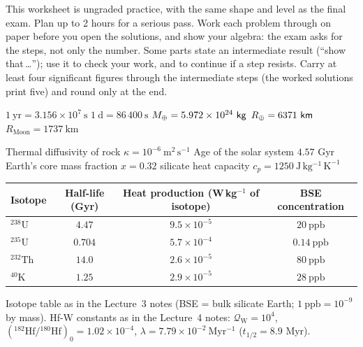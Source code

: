 
\ipsmaketitle

This worksheet is ungraded practice, with the same shape and level as the final exam.
Plan up to 2 hours for a serious pass.
Work each problem through on paper before you open the solutions, and show your algebra:
the exam asks for the steps, not only the number.
Some parts state an intermediate result (``show that\,\ldots''); use it to check your work, and to continue if a step resists.
Carry at least four significant figures through the intermediate steps (the worked solutions print five) and round only at the end.

\begin{given}
$1\ \mathrm{yr} = 3.156 \times 10^{7}\ \mathrm{s}$ \quad
$1\ \mathrm{d} = 86\,400\ \mathrm{s}$ \quad
$\Mearth = 5.972 \times 10^{24}\ \mathrm{kg}$ \quad
$\Rearth = 6371\ \mathrm{km}$ \quad
$R_{\mathrm{Moon}} = 1737\ \mathrm{km}$

\vskip4pt
Thermal diffusivity of rock $\kappa = 10^{-6}\ \mathrm{m^2\,s^{-1}}$ \quad
Age of the solar system $4.57$ Gyr \quad
Earth's core mass fraction $x = 0.32$ \quad
silicate heat capacity $c_p = 1250\ \mathrm{J\,kg^{-1}\,K^{-1}}$

\vskip6pt
\begin{tabular}{@{}lccc@{}}
\toprule
Isotope & Half-life (Gyr) & Heat production (W\,kg$^{-1}$ of isotope) & BSE concentration \\
\midrule
${}^{238}\mathrm{U}$  & $4.47$  & $9.5 \times 10^{-5}$ & $20\ \mathrm{ppb}$ \\
${}^{235}\mathrm{U}$  & $0.704$ & $5.7 \times 10^{-4}$ & $0.14\ \mathrm{ppb}$ \\
${}^{232}\mathrm{Th}$ & $14.0$  & $2.6 \times 10^{-5}$ & $80\ \mathrm{ppb}$ \\
${}^{40}\mathrm{K}$   & $1.25$  & $2.9 \times 10^{-5}$ & $28\ \mathrm{ppb}$ \\
\bottomrule
\end{tabular}

\vskip4pt
{\footnotesize Isotope table as in the Lecture~3 notes (BSE = bulk silicate Earth; $1\ \mathrm{ppb} = 10^{-9}$ by mass).
Hf-W constants as in the Lecture~4 notes: $\mathcal{Q}_\mathrm{W} = 10^4$,
$({}^{182}\mathrm{Hf}/{}^{180}\mathrm{Hf})_0 = 1.02 \times 10^{-4}$,
$\lambda = 7.79 \times 10^{-2}\ \mathrm{Myr^{-1}}$ ($t_{1/2} = 8.9$ Myr).}
\end{given}



